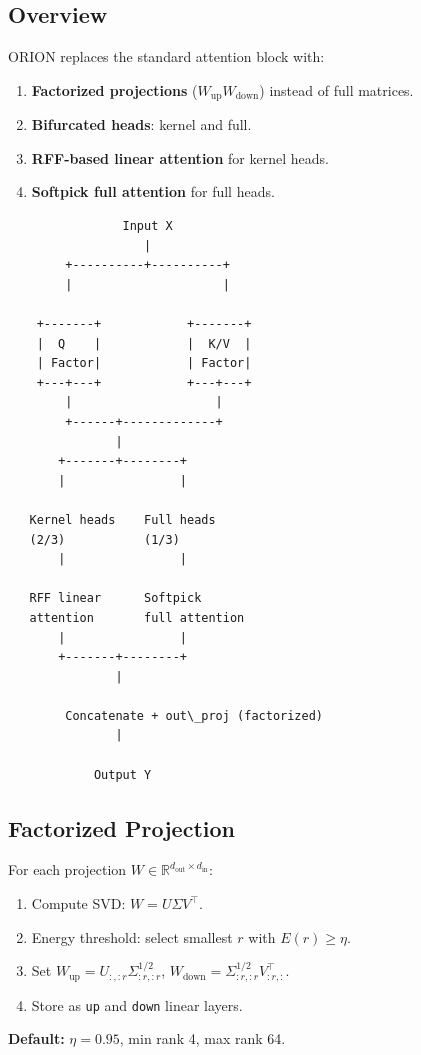 \subsection{Overview}

ORION replaces the standard attention block with:

\begin{enumerate}
\item \textbf{Factorized projections} ($W_\text{up} W_\text{down}$) instead of full
  matrices.
\item \textbf{Bifurcated heads}: kernel and full.
\item \textbf{RFF-based linear attention} for kernel heads.
\item \textbf{Softpick full attention} for full heads.

\end{enumerate}
\begin{lstlisting}
                Input X
                   |
        +----------+----------+
        |                     |
                               
    +-------+            +-------+
    |  Q    |            |  K/V  |
    | Factor|            | Factor|
    +---+---+            +---+---+
        |                    |
        +------+-------------+
               |
       +-------+--------+
       |                |
                         
   Kernel heads    Full heads
   (2/3)           (1/3)
       |                |
                         
   RFF linear      Softpick
   attention       full attention
       |                |
       +-------+--------+
               |
                
        Concatenate + out\_proj (factorized)
               |
                
            Output Y
\end{lstlisting}

\subsection{Factorized Projection}

For each projection $W \in \mathbb{R}^{d_\text{out} \times d_\text{in}}$:

\begin{enumerate}
\item Compute SVD: $W = U \Sigma V^\top$.
\item Energy threshold: select smallest $r$ with $E(r) \geq \eta$.
\item Set $W_\text{up} = U_{:, :r} \Sigma_{:r, :r}^{1/2}$, $W_\text{down} = \Sigma_{:r, :r}^{1/2} V_{:r, :}^\top$.
\item Store as \texttt{up} and \texttt{down} linear layers.

\end{enumerate}
\textbf{Default:} $\eta = 0.95$, min rank 4, max rank 64.

